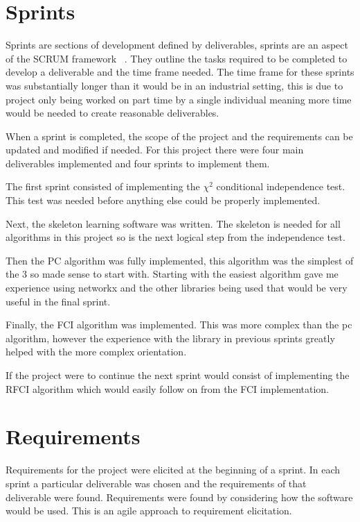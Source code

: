 \documentclass{UoYCSproject}
\begin{document}
\section{Sprints}
Sprints are sections of development defined by deliverables, sprints are an aspect of the SCRUM framework ~\parencite{schwaber1997scrum}. They outline the tasks required to be completed to develop a deliverable and the time frame needed. The time frame for these sprints was substantially longer than it would be in an industrial setting, this is due to project only being worked on part time by a single individual meaning more time would be needed to create reasonable deliverables.

When a sprint is completed, the scope of the project and the requirements can be updated and modified if needed. For this project there were four main deliverables implemented and four sprints to implement them.

The first sprint consisted of implementing the $\chi ^2$ conditional independence test. This test was needed before anything else could be properly implemented.

Next, the skeleton learning software was written. The skeleton is needed for all algorithms in this project so is the next logical step from the independence test.

Then the PC algorithm was fully implemented, this algorithm was the simplest of the 3 so made sense to start with. Starting with the easiest algorithm gave me experience using networkx and the other libraries being used that would be very useful in the final sprint.

Finally, the FCI algorithm was implemented. This was more complex than the pc algorithm, however the experience with the library in previous sprints greatly helped with the more complex orientation.

If the project were to continue the next sprint would consist of implementing the RFCI algorithm which would easily follow on from the FCI implementation.

\section{Requirements}
Requirements for the project were elicited at the beginning of a sprint. In each sprint a particular deliverable was chosen and the requirements of that deliverable were found. Requirements were found by considering how the software would be used. This is an agile approach to requirement elicitation.
\end{document}
